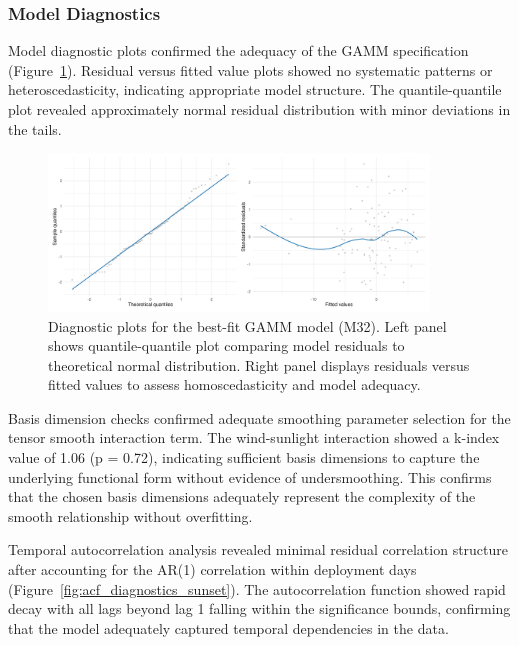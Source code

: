 \subsubsection{Model Diagnostics}

Model diagnostic plots confirmed the adequacy of the GAMM specification (Figure~\ref{fig:model_diagnostics_sunset}). Residual versus fitted value plots showed no systematic patterns or heteroscedasticity, indicating appropriate model structure. The quantile-quantile plot revealed approximately normal residual distribution with minor deviations in the tails.

\begin{figure}[htbp]
    \centering
    \includegraphics[width=0.9\textwidth]{supplemental/results/sunset/figures/diag_qq_and_residuals_1x2.png}
    \caption[Diagnostic plots (M32)]{Diagnostic plots for the best-fit GAMM model (M32). Left panel shows quantile-quantile plot comparing model residuals to theoretical normal distribution. Right panel displays residuals versus fitted values to assess homoscedasticity and model adequacy.}
    \label{fig:model_diagnostics_sunset}
\end{figure}

Basis dimension checks confirmed adequate smoothing parameter selection for the tensor smooth interaction term. The wind-sunlight interaction showed a k-index value of 1.06 (p = 0.72), indicating sufficient basis dimensions to capture the underlying functional form without evidence of undersmoothing. This confirms that the chosen basis dimensions adequately represent the complexity of the smooth relationship without overfitting.

Temporal autocorrelation analysis revealed minimal residual correlation structure after accounting for the AR(1) correlation within deployment days (Figure~\ref{fig:acf_diagnostics_sunset}). The autocorrelation function showed rapid decay with all lags beyond lag 1 falling within the significance bounds, confirming that the model adequately captured temporal dependencies in the data. 

